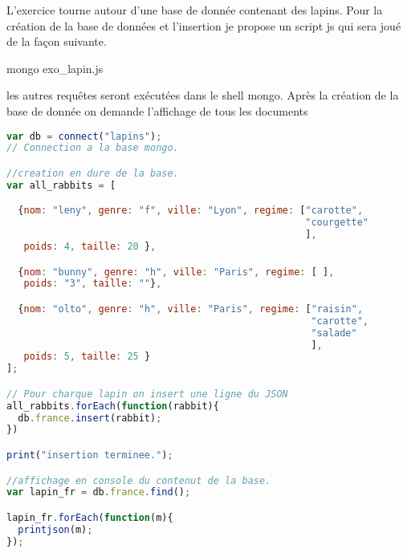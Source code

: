 L'exercice tourne autour d'une base de donnée contenant des lapins. Pour la création de la base de données et l’insertion je propose un script js qui sera joué de la façon suivante. \newline
    \begin{tt} mongo exo\_lapin.js \end{tt} \newline
    les autres requêtes seront exécutées dans le shell mongo. Après la création de la base de donnée on demande l’affichage de tous les documents\newline
    
\begin{lstlisting}[language=JavaScript, caption= Création de la base de donnée "lapin"]
var db = connect("lapins");
// Connection a la base mongo.

//creation en dure de la base.
var all_rabbits = [

  {nom: "leny", genre: "f", ville: "Lyon", regime: ["carotte",
                                                    "courgette"
                                                    ],
   poids: 4, taille: 20 },

  {nom: "bunny", genre: "h", ville: "Paris", regime: [ ],
   poids: "3", taille: ""},

  {nom: "olto", genre: "h", ville: "Paris", regime: ["raisin",
                                                     "carotte",
                                                     "salade"
                                                     ],
   poids: 5, taille: 25 }
];

// Pour charque lapin on insert une ligne du JSON
all_rabbits.forEach(function(rabbit){
  db.france.insert(rabbit);
})

print("insertion terminee.");

//affichage en console du contenut de la base.
var lapin_fr = db.france.find();

lapin_fr.forEach(function(m){
  printjson(m);
});
\end{lstlisting}